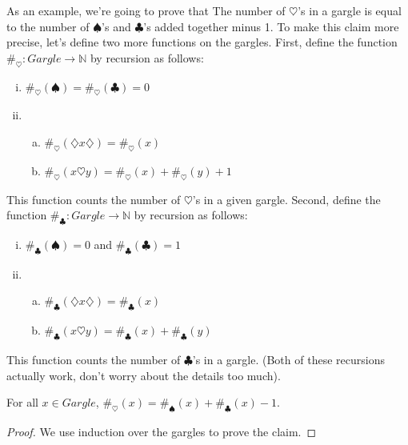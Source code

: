 \begin{enumerate}[{\thesection}.1]
\begin{enumerate}[(i)]
		\end{enumerate}
		
	As an example, we're going to prove that The number of $\heartsuit$'s in a gargle is equal to the number of $\spadesuit$'s and $\clubsuit$'s added together minus 1. To make this claim more precise, let's define two more functions on the gargles. First, define the function $\#_\heartsuit:Gargle\to\mathbb{N}$ by recursion as follows:
	\begin{enumerate}[(i)]
	
		\item $\#_\heartsuit(\spadesuit)=\#_\heartsuit(\clubsuit)=0$
		
		\item \begin{enumerate}[(a)]

			\item $\#_\heartsuit(\diamondsuit x\diamondsuit)=\#_\heartsuit(x)$
			
			\item $\#_\heartsuit(x\heartsuit y)=\#_\heartsuit(x)+\#_\heartsuit(y)+1$

		\end{enumerate}
	
	\end{enumerate}
	This function counts the number of $\heartsuit$'s in a given gargle. Second, define the function $\#_\clubsuit:Gargle\to\mathbb{N}$ by recursion as follows:
	\begin{enumerate}[(i)]
	
		\item $\#_\clubsuit(\spadesuit)=0$ and $\#_\clubsuit(\clubsuit)=1$
		
		\item \begin{enumerate}[(a)]

			\item $\#_\clubsuit(\diamondsuit x\diamondsuit)=\#_\clubsuit(x)$
			
			\item $\#_\clubsuit(x\heartsuit y)=\#_\clubsuit(x)+\#_\clubsuit(y)$

		\end{enumerate}
	
	\end{enumerate}
	This function counts the number of $\clubsuit$'s in a gargle. (Both of these recursions actually work, don't worry about the details too much).
	
		\begin{theorem}
		For all $x\in Gargle$, $\#_\heartsuit(x)=\#_\spadesuit(x)+\#_\clubsuit(x)-1$.
		\end{theorem}
			\begin{proof}
			We use induction over the gargles to prove the claim.
			

\end{proof}
\end{enumerate}
